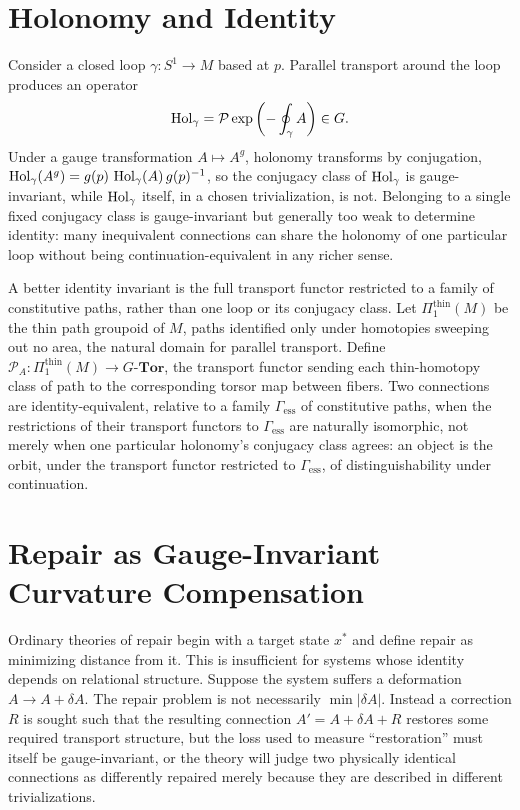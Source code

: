 \section{Holonomy and Identity}

Consider a closed loop $\gamma : S^1 \to M$ based at $p$. Parallel transport around the loop produces an operator
\[
\operatorname{Hol}_\gamma = \mathcal{P}\exp\left(-\oint_\gamma A\right) \in G.
\]
Under a gauge transformation $A \mapsto A^g$, holonomy transforms by conjugation, $\operatorname{Hol}_\gamma(A^g) = g(p)\,\operatorname{Hol}_\gamma(A)\,g(p)^{-1}$, so the conjugacy class of $\operatorname{Hol}_\gamma$ is gauge-invariant, while $\operatorname{Hol}_\gamma$ itself, in a chosen trivialization, is not. Belonging to a single fixed conjugacy class is gauge-invariant but generally too weak to determine identity: many inequivalent connections can share the holonomy of one particular loop without being continuation-equivalent in any richer sense.

A better identity invariant is the full transport functor restricted to a family of constitutive paths, rather than one loop or its conjugacy class. Let $\Pi_1^{\mathrm{thin}}(M)$ be the thin path groupoid of $M$, paths identified only under homotopies sweeping out no area, the natural domain for parallel transport. Define $\mathcal{P}_A : \Pi_1^{\mathrm{thin}}(M) \to G\text{-}\mathbf{Tor}$, the transport functor sending each thin-homotopy class of path to the corresponding torsor map between fibers. Two connections are identity-equivalent, relative to a family $\Gamma_{\mathrm{ess}}$ of constitutive paths, when the restrictions of their transport functors to $\Gamma_{\mathrm{ess}}$ are naturally isomorphic, not merely when one particular holonomy's conjugacy class agrees: an object is the orbit, under the transport functor restricted to $\Gamma_{\mathrm{ess}}$, of distinguishability under continuation.

\section{Repair as Gauge-Invariant Curvature Compensation}

Ordinary theories of repair begin with a target state $x^\ast$ and define repair as minimizing distance from it. This is insufficient for systems whose identity depends on relational structure. Suppose the system suffers a deformation $A \to A + \delta A$. The repair problem is not necessarily $\min|\delta A|$. Instead a correction $R$ is sought such that the resulting connection $A' = A + \delta A + R$ restores some required transport structure, but the loss used to measure ``restoration'' must itself be gauge-invariant, or the theory will judge two physically identical connections as differently repaired merely because they are described in different trivializations.

